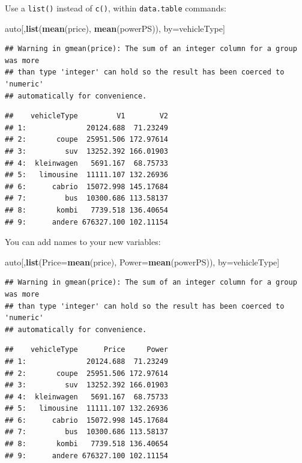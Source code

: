 \documentclass[]{book}
\newenvironment{Shaded}{\begin{snugshade}}{\end{snugshade}}
\newcommand{\DataTypeTok}[1]{\textcolor[rgb]{0.13,0.29,0.53}{#1}}
\newcommand{\KeywordTok}[1]{\textcolor[rgb]{0.13,0.29,0.53}{\textbf{#1}}}
\newcommand{\NormalTok}[1]{#1}
\theoremstyle{definition}
\theoremstyle{definition}
\theoremstyle{definition}
\theoremstyle{remark}
\begin{document}
Use a \texttt{list()} instead of \texttt{c()}, within \texttt{data.table} commands:

\begin{Shaded}
\begin{Highlighting}[]
\NormalTok{auto[,}\KeywordTok{list}\NormalTok{(}\KeywordTok{mean}\NormalTok{(price), }\KeywordTok{mean}\NormalTok{(powerPS)), by=vehicleType]}
\end{Highlighting}
\end{Shaded}

\begin{verbatim}
## Warning in gmean(price): The sum of an integer column for a group was more
## than type 'integer' can hold so the result has been coerced to 'numeric'
## automatically for convenience.
\end{verbatim}

\begin{verbatim}
##    vehicleType         V1        V2
## 1:              20124.688  71.23249
## 2:       coupe  25951.506 172.97614
## 3:         suv  13252.392 166.01903
## 4:  kleinwagen   5691.167  68.75733
## 5:   limousine  11111.107 132.26936
## 6:      cabrio  15072.998 145.17684
## 7:         bus  10300.686 113.58137
## 8:       kombi   7739.518 136.40654
## 9:      andere 676327.100 102.11154
\end{verbatim}

You can add names to your new variables:

\begin{Shaded}
\begin{Highlighting}[]
\NormalTok{auto[,}\KeywordTok{list}\NormalTok{(}\DataTypeTok{Price=}\KeywordTok{mean}\NormalTok{(price), }\DataTypeTok{Power=}\KeywordTok{mean}\NormalTok{(powerPS)), by=vehicleType]}
\end{Highlighting}
\end{Shaded}

\begin{verbatim}
## Warning in gmean(price): The sum of an integer column for a group was more
## than type 'integer' can hold so the result has been coerced to 'numeric'
## automatically for convenience.
\end{verbatim}

\begin{verbatim}
##    vehicleType      Price     Power
## 1:              20124.688  71.23249
## 2:       coupe  25951.506 172.97614
## 3:         suv  13252.392 166.01903
## 4:  kleinwagen   5691.167  68.75733
## 5:   limousine  11111.107 132.26936
## 6:      cabrio  15072.998 145.17684
## 7:         bus  10300.686 113.58137
## 8:       kombi   7739.518 136.40654
## 9:      andere 676327.100 102.11154
\end{verbatim}
\end{document}
